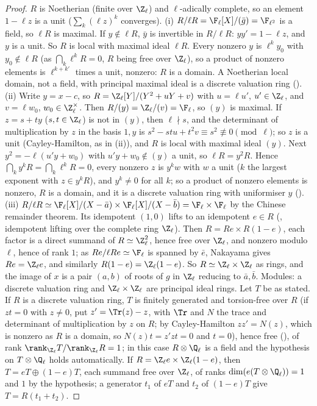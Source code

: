 \begin{proof}
$R$ is Noetherian (finite over $\Z_\ell$) and $\ell$-adically complete, so an element $1-\ell z$ is a unit ($\sum_k(\ell z)^k$ converges).
(i) $R/\ell R=\F_\ell[X]/(\bar g)=\F_{\ell^2}$ is a field, so $\ell R$ is maximal. If $y\notin\ell R$, $\bar y$ is invertible in $R/\ell R$: $yy'=1-\ell z$, and
$y$ is a unit. So $R$ is local with maximal ideal $\ell R$. Every nonzero $y$ is $\ell^ky_0$ with $y_0\notin\ell R$ (as $\bigcap_k\ell^kR=0$, $R$ being free over
$\Z_\ell$), so a product of nonzero elements is $\ell^{k+k'}$ times a unit, nonzero: $R$ is a domain. A Noetherian local domain, not a field, with
principal maximal ideal is a discrete valuation ring ().
(ii) Write $y=x-c$, so $R=\Z_\ell[Y]/(Y^2+uY+v)$ with $u=\ell u'$, $u'\in\Z_\ell$, and $v=\ell w_0$, $w_0\in\Z_\ell^\times$. Then $R/(y)=\Z_\ell/(v)=\F_\ell$,
so $(y)$ is maximal. If $z=s+ty$ ($s,t\in\Z_\ell$) is not in $(y)$, then $\ell\nmid s$, and the determinant of multiplication by $z$ in the basis $1,y$ is
$s^2-stu+t^2v\equiv s^2\not\equiv0\pmod\ell$; so $z$ is a unit (Cayley-Hamilton, as in (ii)), and $R$ is local with maximal ideal $(y)$.
Next $y^2=-\ell(u'y+w_0)$ with $u'y+w_0\notin(y)$ a unit, so $\ell R=y^2R$. Hence $\bigcap_ky^kR=\bigcap_k\ell^kR=0$, every nonzero $z$ is $y^kw$ with $w$ a unit
($k$ the largest exponent with $z\in y^kR$), and $y^k\ne0$ for all $k$; so a product of nonzero elements is nonzero, $R$ is a domain, and it is a discrete
valuation ring with uniformiser $y$ ().
(iii) $R/\ell R\simeq\F_\ell[X]/(X-\bar a)\times\F_\ell[X]/(X-\bar b)=\F_\ell\times\F_\ell$ by the Chinese remainder theorem. Its idempotent $(1,0)$ lifts to an
idempotent $e\in R$ (, idempotent lifting over the complete ring $\Z_\ell$). Then $R=Re\times R(1-e)$, each factor is a direct summand of
$R\simeq\Z_\ell^2$, hence free over $\Z_\ell$, and nonzero modulo $\ell$, hence of rank $1$; as $Re/\ell Re\simeq\F_\ell$ is spanned by $\bar e$, Nakayama gives
$Re=\Z_\ell e$, and similarly $R(1-e)=\Z_\ell(1-e)$. So $R\simeq\Z_\ell\times\Z_\ell$ as rings, and the image of $x$ is a pair $(a,b)$ of roots of $g$ in $\Z_\ell$
reducing to $\bar a,\bar b$.
Modules: a discrete valuation ring and $\Z_\ell\times\Z_\ell$ are principal ideal rings. Let $T$ be as stated. If $R$ is a discrete valuation ring, $T$ is
finitely generated and torsion-free over $R$ (if $zt=0$ with $z\ne0$, put $z'=\Tr(z)-z$, with $\Tr$ and $N$ the trace and determinant of multiplication by $z$ on $R$; by Cayley-Hamilton
$zz'=N(z)$, which is nonzero as $R$ is a domain, so $N(z)t=z'zt=0$ and $t=0$), hence free (), of rank $\rank_{\Z_\ell}T/\rank_{\Z_\ell}R=1$; in this case
$R\otimes\Q_\ell$ is a field and the hypothesis on $T\otimes\Q_\ell$ holds automatically. If $R=\Z_\ell e\times\Z_\ell(1-e)$, then $T=eT\oplus(1-e)T$, each summand free over $\Z_\ell$, of
ranks $\dim(e(T\otimes\Q_\ell))=1$ and $1$ by the hypothesis; a generator $t_1$ of $eT$ and $t_2$ of $(1-e)T$ give $T=R(t_1+t_2)$.
\end{proof}

